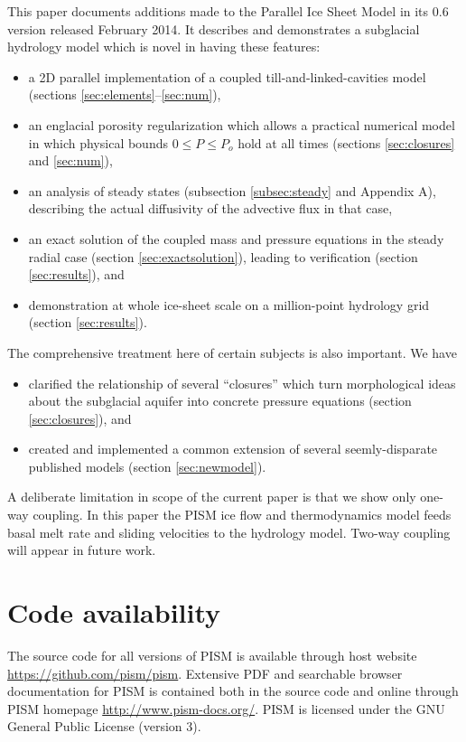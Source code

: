 \documentclass[gmd]{copernicus}   %
\begin{document}
\conclusions  \label{sec:conclusion}  This paper documents additions made to the Parallel Ice Sheet Model in its 0.6 version released February 2014.  It describes and demonstrates a subglacial hydrology model which is novel in having these features:\begin{itemize}
\item a 2D parallel implementation of a coupled till-and-linked-cavities model (sections \ref{sec:elements}--\ref{sec:num}),
\item an englacial porosity regularization which allows a practical numerical model in which physical bounds $0\le P \le P_o$ hold at all times (sections \ref{sec:closures} and \ref{sec:num}),
\item an analysis of steady states (subsection \ref{subsec:steady} and Appendix A), describing the actual diffusivity of the advective flux in that case,
\item an exact solution of the coupled mass and pressure equations in the steady radial case (section \ref{sec:exactsolution}), leading to verification (section \ref{sec:results}), and
\item demonstration at whole ice-sheet scale on a million-point hydrology grid (section \ref{sec:results}).
\end{itemize}
The comprehensive treatment here of certain subjects is also important.  We have
\begin{itemize}
\item clarified the relationship of several ``closures'' which turn morphological ideas about the subglacial aquifer into concrete pressure equations (section \ref{sec:closures}), and
\item created and implemented a common extension of several seemly-disparate published models (section \ref{sec:newmodel}).
\end{itemize}
A deliberate limitation in scope of the current paper is that we show only one-way coupling.  In this paper the PISM ice flow and thermodynamics model feeds basal melt rate and sliding velocities to the hydrology model.  Two-way coupling  will appear in future work.


\section{Code availability}  \label{sec:availability}

The source code for all versions of PISM is available through host website \url{https://github.com/pism/pism}.  Extensive PDF and searchable browser documentation for PISM is contained both in the source code and online through PISM homepage \url{http://www.pism-docs.org/}.  PISM is licensed under the GNU General Public License (version 3).
\end{document}
